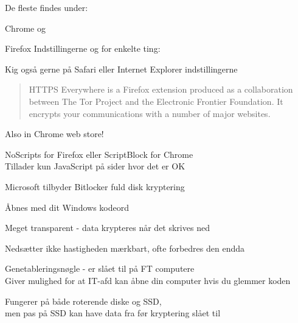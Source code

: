 \documentclass[18pt,landscape,a4paper,footrule]{foils}
\begin{document}


De fleste findes under:
\begin{list2}
\item Chrome  og 
\item Firefox Indstillingerne og for enkelte ting: 
\end{list2}

\centerline{Kig også gerne på Safari eller Internet Explorer indstillingerne}




\begin{quote}
HTTPS Everywhere is a Firefox extension produced as a collaboration between The Tor Project and the Electronic Frontier Foundation. It encrypts your communications with a number of major websites.
\end{quote}

\centerline{}

Also in Chrome web store!




\vskip 2cm
NoScripts for Firefox eller ScriptBlock for Chrome\\
Tillader kun JavaScript på sider hvor det er OK





\begin{list2}
\item Microsoft tilbyder Bitlocker fuld disk kryptering
\item Åbnes med dit Windows kodeord
\item Meget transparent - data krypteres når det skrives ned
\item Nedsætter ikke hastigheden mærkbart, ofte forbedres den endda
\item Genetableringsnøgle - er slået til på FT computere\\
Giver mulighed for at IT-afd kan åbne din computer hvis du glemmer koden
\item Fungerer på både roterende diske og SSD, \\
men pas på SSD kan have data fra før kryptering slået til
\end{list2}
\end{document}
